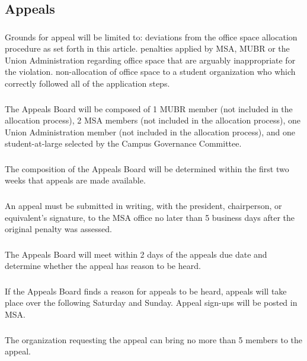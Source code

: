 \subsection{Appeals}
\subsubsection{}
Grounds for appeal will be limited to:
\subsubsubsection{}
deviations from the office space allocation procedure as set forth in this article.  
\subsubsubsection{}
penalties applied by MSA, MUBR or the Union Administration regarding office space that are arguably inappropriate for the violation.
\subsubsubsection{}
non-allocation of office space to a student organization who which correctly followed all of the application steps.
\subsubsection{}
The Appeals Board will be composed of 1 MUBR member (not included in the allocation process), 2 MSA members (not included in the allocation process), one Union Administration member (not included in the allocation process), and one student-at-large selected by the Campus Governance Committee.
\subsubsection{}
The composition of the Appeals Board will be determined within the first two weeks that appeals are made available.
\subsubsection{}
An appeal must be submitted in writing, with the president, chairperson, or equivalent's signature, to the MSA office no later than 5 business days after the original penalty was assessed.
\subsubsection{}
The Appeals Board will meet within 2 days of the appeals due date and determine whether the appeal has reason to be heard.
\subsubsection{}
If the Appeals Board finds a reason for appeals to be heard, appeals will take place over the following Saturday and Sunday.  Appeal sign-ups will be posted in MSA.
\subsubsection{}
The organization requesting the appeal can bring no more than 5 members to the appeal.
